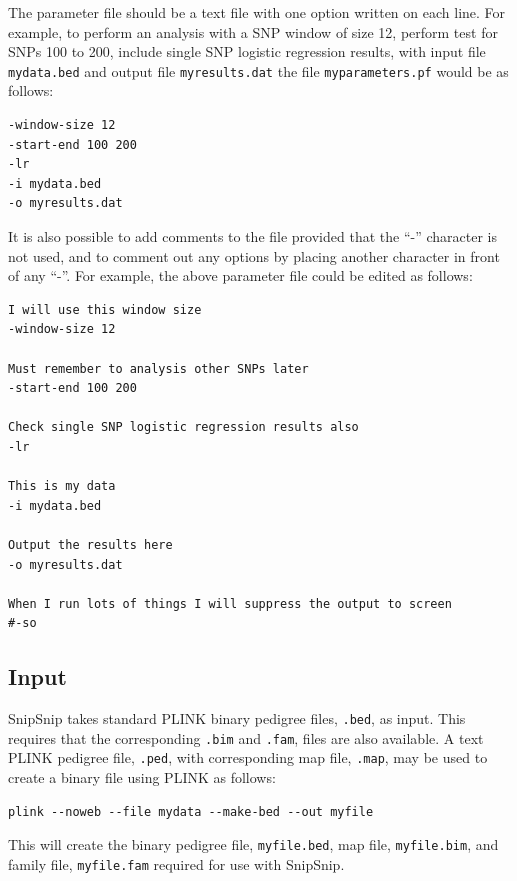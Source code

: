 \documentclass[a4paper,12pt]{article}
\newcommand{\code}[1]{{\footnotesize{{\tt #1}}}}
\begin{document}
The parameter file should be a text file with one option written on each line. For example, to perform an analysis with a SNP window of size 12, perform test for SNPs 100 to 200, include single SNP logistic regression results, with input file \code{mydata.bed} and output file \code{myresults.dat} the file \code{myparameters.pf} would be as follows: 
\begin{verbatim}
-window-size 12
-start-end 100 200
-lr
-i mydata.bed
-o myresults.dat
\end{verbatim}

It is also possible to add comments to the file provided that the ``-'' character is not used, and to comment out any options by placing another character in front of any ``-''. For example, the above parameter file could be edited as follows: 
\begin{verbatim}
I will use this window size
-window-size 12

Must remember to analysis other SNPs later
-start-end 100 200

Check single SNP logistic regression results also
-lr

This is my data
-i mydata.bed

Output the results here
-o myresults.dat

When I run lots of things I will suppress the output to screen 
#-so
\end{verbatim}


\subsection{Input}
\label{input}

SnipSnip takes standard PLINK binary pedigree files, \code{.bed}, as input. This requires that the corresponding \code{.bim} and \code{.fam}, files are also available. A text PLINK pedigree file, \code{.ped}, with corresponding map file, \code{.map}, may be used to create a binary file using PLINK as follows: \begin{verbatim}
plink --noweb --file mydata --make-bed --out myfile
\end{verbatim}


This will create the binary pedigree file, \code{myfile.bed}, map file, \code{myfile.bim}, and family file, \code{myfile.fam} required for use with SnipSnip. 

\end{document}
